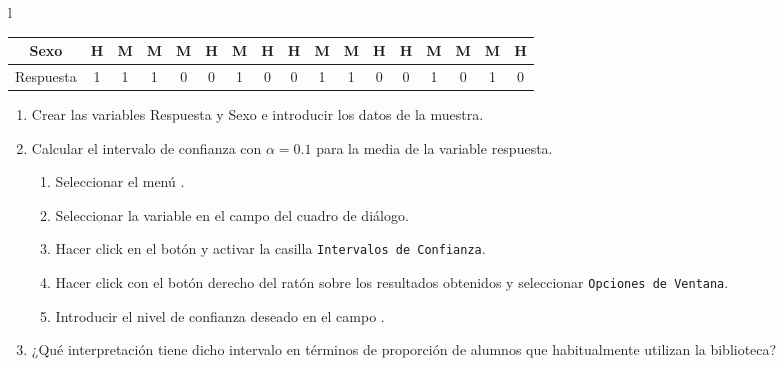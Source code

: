 \documentclass[a4paper]{article}
\begin{document}
\begin{enumerate}[leftmargin=*]
\begin{center}
\begin{tabular}{l}
\begin{tabular}{|l|l|l|l|l|l|l|l|l|l|l|l|l|l|l|l|l|}
\hline
\multicolumn{1}{|c|}{Sexo} & \multicolumn{1}{c|}{H} & \multicolumn{1}{c|}{M} & \multicolumn{1}{c|}{M} & \multicolumn{1}{c|}{M} & \multicolumn{1}{c|}{H} & \multicolumn{1}{c|}{M} & \multicolumn{1}{c|}{H} & \multicolumn{1}{c|}{H} & \multicolumn{1}{c|}{M} & \multicolumn{1}{c|}{M} & \multicolumn{1}{c|}{H} & \multicolumn{1}{c|}{H} & \multicolumn{1}{c|}{M} & \multicolumn{1}{c|}{M} & \multicolumn{1}{c|}{M} & \multicolumn{1}{c|}{H}  \\
\hline
\multicolumn{1}{|c|}{Respuesta} & \multicolumn{1}{c|}{1} & \multicolumn{1}{c|}{1} & \multicolumn{1}{c|}{1} & \multicolumn{1}{c|}{0} & \multicolumn{1}{c|}{0} & \multicolumn{1}{c|}{1} & \multicolumn{1}{c|}{0} & \multicolumn{1}{c|}{0} & \multicolumn{1}{c|}{1} & \multicolumn{1}{c|}{1} & \multicolumn{1}{c|}{0} & \multicolumn{1}{c|}{0} & \multicolumn{1}{c|}{1} & \multicolumn{1}{c|}{0} & \multicolumn{1}{c|}{1} & \multicolumn{1}{c|}{0} \\
\hline
\end{tabular}
\end{tabular}
\end{center}

\begin{enumerate}
\item Crear las variables \textsf{Respuesta} y \textsf{Sexo} e introducir los datos de la muestra.

\item Calcular el intervalo de confianza con $\alpha=0.1$ para la media de la variable respuesta.
\begin{indicacion}{
\begin{enumerate}
\item Seleccionar el menú .
\item Seleccionar la variable  en el campo  del cuadro de diálogo.
\item Hacer click en el botón  y activar la casilla \texttt{Intervalos de Confianza}.
\item Hacer click con el botón derecho del ratón sobre los resultados obtenidos y seleccionar \texttt{Opciones de Ventana}.
\item Introducir el nivel de confianza deseado en el campo .
\end{enumerate}}
\end{indicacion}

\item ¿Qué interpretación tiene dicho intervalo en términos de proporción de alumnos que habitualmente utilizan la biblioteca?


\end{enumerate}
\end{enumerate}
\end{document}
